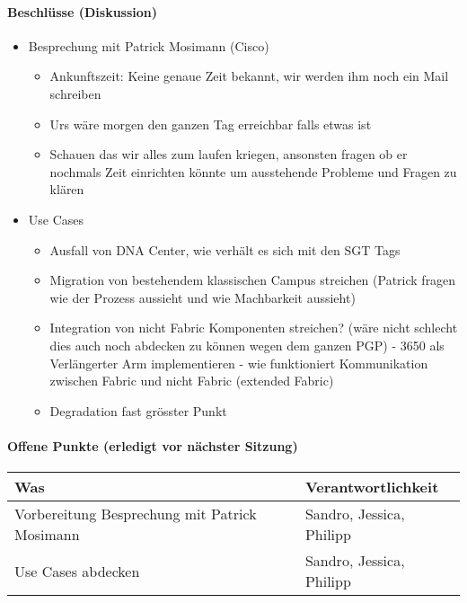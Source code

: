 \paragraph{Beschlüsse (Diskussion)}
\begin{itemize}	
	\item Besprechung mit Patrick Mosimann (Cisco)
	\begin{itemize}
		\item Ankunftszeit: Keine genaue Zeit bekannt, wir werden ihm noch ein Mail schreiben
		\item Urs wäre morgen den ganzen Tag erreichbar falls etwas ist
		\item Schauen das wir alles zum laufen kriegen, ansonsten fragen ob er nochmals Zeit einrichten könnte um ausstehende Probleme und Fragen zu klären
	\end{itemize}
	\item Use Cases
	\begin{itemize}
		\item Ausfall von DNA Center, wie verhält es sich mit den SGT Tags
		\item Migration von bestehendem klassischen Campus streichen (Patrick fragen wie der Prozess aussieht und wie Machbarkeit aussieht)
		\item Integration von nicht Fabric Komponenten streichen? (wäre nicht schlecht dies auch noch abdecken zu können wegen dem ganzen PGP) - 3650 als Verlängerter Arm implementieren - wie funktioniert Kommunikation zwischen Fabric und nicht Fabric (extended Fabric)
		\item Degradation fast grösster Punkt
	\end{itemize}
\end{itemize}

\paragraph{Offene Punkte (erledigt vor nächster Sitzung)} \mbox{}

\begin{table}[H]
	\centering
	\begin{tabularx}{\textwidth}{X | p{4.5cm}}
		\rowcolor{gray!50}
		\textbf{Was} & \textbf{Verantwortlichkeit} \\
		\hline
		Vorbereitung Besprechung mit Patrick Mosimann & Sandro, Jessica, Philipp \\
		Use Cases abdecken & Sandro, Jessica, Philipp \\
	\end{tabularx}
	\label{tab:my-label}
\end{table}

